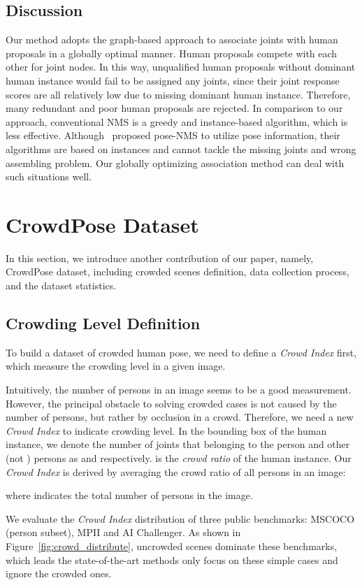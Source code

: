 \documentclass[10pt,twocolumn,letterpaper]{article}
\begin{document}
\subsection{Discussion} Our method adopts the graph-based approach to associate joints with human proposals in a globally optimal manner. Human proposals compete with each other for joint nodes. In this way, unqualified human proposals without dominant human instance would fail to be assigned any joints, since their joint response scores are all relatively low due to missing dominant human instance. Therefore, many redundant and poor human proposals are rejected. In comparison to our approach, conventional NMS is a greedy and instance-based algorithm, which is less effective. Although~\cite{nms1, nms2, alphapose} proposed pose-NMS to utilize pose information, their algorithms are based on instances and cannot tackle the missing joints and wrong assembling problem. Our globally optimizing association method can deal with such situations well.

\section{CrowdPose Dataset}
In this section, we introduce another contribution of our paper, namely, CrowdPose dataset, including crowded scenes definition, data collection process, and the dataset statistics.

\subsection{Crowding Level Definition}
To build a dataset of crowded human pose, we need to define a \textit{Crowd Index} first, which measure the crowding level in a given image.

Intuitively, the number of persons in an image seems to be a good measurement. However, the principal obstacle to solving crowded cases is not caused by the number of persons, but rather by occlusion in a crowd. Therefore, we need a new \textit{Crowd Index} to indicate crowding level. In the bounding box of the  human instance, we denote the number of joints that belonging to the  person and other (not ) persons as  and  respectively.  is the \textit{crowd ratio} of the  human instance. Our \textit{Crowd Index} is derived by averaging the crowd ratio of all persons in an image:

where  indicates the total number of persons in the image.

We evaluate the \textit{Crowd Index} distribution of three public benchmarks: MSCOCO (person subset), MPII and AI Challenger. As shown in Figure~\ref{fig:crowd_distribute}, uncrowded scenes dominate these benchmarks, which leads the state-of-the-art methods only focus on these simple cases and ignore the crowded ones.
\end{document}
